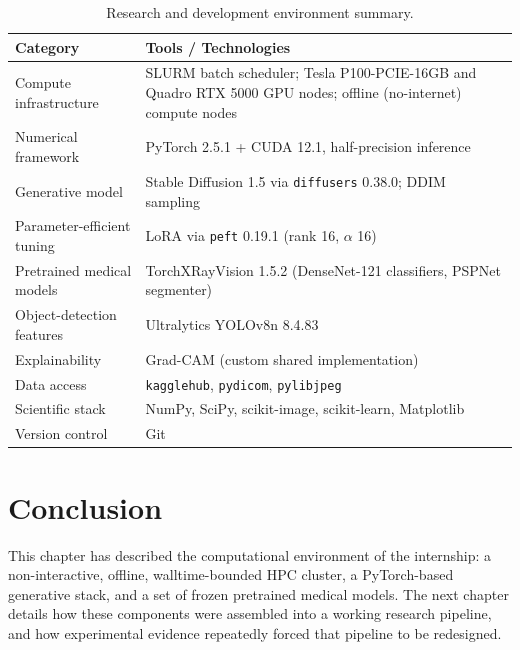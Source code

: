\begin{table}[h]
\centering
\caption{Research and development environment summary.}
\label{tab:toolchain}
\begin{tabular}{@{}p{}p{}@{}}
\toprule
\textbf{Category} & \textbf{Tools / Technologies} \\
\midrule
Compute infrastructure & SLURM batch scheduler; Tesla P100-PCIE-16GB and
Quadro RTX 5000 GPU nodes; offline (no-internet) compute nodes \\
Numerical framework & PyTorch 2.5.1 + CUDA 12.1, half-precision inference \\
Generative model & Stable Diffusion 1.5 via \texttt{diffusers} 0.38.0; DDIM sampling \\
Parameter-efficient tuning & LoRA via \texttt{peft} 0.19.1 (rank 16, $\alpha$ 16) \\
Pretrained medical models & TorchXRayVision 1.5.2 (DenseNet-121 classifiers, PSPNet segmenter) \\
Object-detection features & Ultralytics YOLOv8n 8.4.83 \\
Explainability & Grad-CAM (custom shared implementation) \\
Data access & \texttt{kagglehub}, \texttt{pydicom}, \texttt{pylibjpeg} \\
Scientific stack & NumPy, SciPy, scikit-image, scikit-learn, Matplotlib \\
Version control & Git \\
\bottomrule
\end{tabular}
\end{table}

\section{Conclusion}

This chapter has described the computational environment of the
internship: a non-interactive, offline, walltime-bounded HPC cluster, a
PyTorch-based generative stack, and a set of frozen pretrained medical
models. The next chapter details how these components were assembled into
a working research pipeline, and how experimental evidence repeatedly
forced that pipeline to be redesigned.
